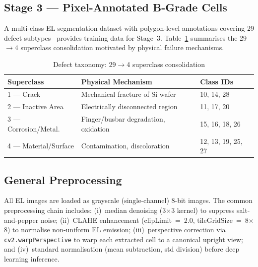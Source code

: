 \documentclass[conference]{IEEEtran}
\begin{document}
\subsection{Stage 3 --- Pixel-Annotated B-Grade Cells}

A multi-class EL segmentation dataset with polygon-level
annotations covering 29 defect subtypes~\cite{dataset_tbd}
provides training data for Stage~3.
Table~\ref{tab:taxonomy} summarises the 29$\to$4 superclass
consolidation motivated by physical failure mechanisms.

\begin{table}[t]
  \caption{Defect taxonomy: 29$\to$4 superclass consolidation}
  \label{tab:taxonomy}
  \begin{center}
  \renewcommand{\arraystretch}{1.15}
  \begin{tabular}{lp{2.8cm}p{1.5cm}}
    \toprule
    \textbf{Superclass} & \textbf{Physical Mechanism} &
    \textbf{Class IDs} \\
    \midrule
    1 --- Crack &
      Mechanical fracture of Si wafer &
      10, 14, 28 \\
    2 --- Inactive Area &
      Electrically disconnected region &
      11, 17, 20 \\
    3 --- Corrosion/Metal. &
      Finger/busbar degradation, oxidation &
      15, 16, 18, 26 \\
    4 --- Material/Surface &
      Contamination, discoloration &
      12, 13, 19, 25, 27 \\
    \bottomrule
  \end{tabular}
  \end{center}
\end{table}

\subsection{General Preprocessing}

All EL images are loaded as grayscale (single-channel) 8-bit
images. The common preprocessing chain includes:
(i)~median denoising (3$\times$3 kernel) to suppress
salt-and-pepper noise;
(ii)~CLAHE enhancement (clipLimit~=~2.0,
tileGridSize~=~8$\times$8) to normalise non-uniform EL emission;
(iii)~perspective correction via \texttt{cv2.warpPerspective}
to warp each extracted cell to a canonical upright view; and
(iv)~standard normalisation (mean subtraction, std division)
before deep learning inference.

\end{document}
